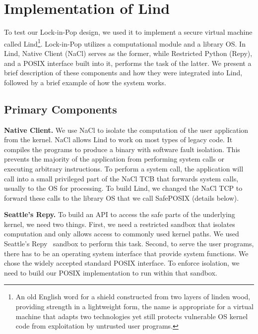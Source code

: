 \section{Implementation of Lind}
\label{sec.implementation}

To test our Lock-in-Pop design, we used it to implement a secure virtual machine
called Lind\footnote{\scriptsize An old English word for a shield constructed from two layers of
linden wood, providing strength in a lightweight form, the name is appropriate for
a virtual machine that adapts two technologies\textendash
yet still protects vulnerable OS kernel code from exploitation by
untrusted user programs.}. 
Lock-in-Pop utilizes a
computational module and a library OS. In Lind, Native Client (NaCl) serves as the former,
while Restricted Python (Repy), and a POSIX interface built into it, performs the task of the latter.
We present a brief description of these components and how they were integrated
into Lind, followed by a brief example of how the system works.

\subsection{Primary Components}

\textbf{Native Client.}
We use NaCl to isolate the computation of the user application
from the kernel. NaCl allows Lind to work on most types of legacy code.
It compiles the programs to produce a binary with software fault isolation.
This prevents the majority of the application from performing system calls
or executing arbitrary instructions.
To perform a system call, the application will call into a small privileged
part of the NaCl TCB that forwards system calls, usually to the OS for
processing. To build Lind, we changed the NaCl TCP to
forward these calls to the library OS that we call SafePOSIX (details below).

\textbf{Seattle's Repy.}
To build an API to access the safe parts of the underlying kernel, we need
two things. First, we need a restricted sandbox that isolates computation
and only allows access to commonly used kernel paths.  We used
Seattle's Repy~\cite{Repy-10} sandbox to perform this task.
Second, to serve the user programs, there has to be an operating system interface that 
provide system functions. We chose the widely accepted standard POSIX interface. 
To enforce isolation, we need to build our POSIX implementation to run within that sandbox.

